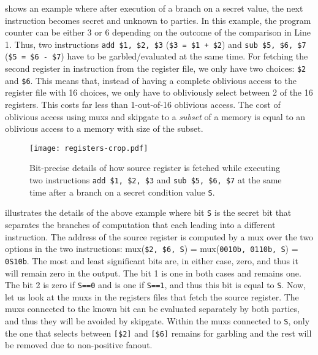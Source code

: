  shows an example where after execution of a branch on a secret value, the next instruction becomes secret and unknown to parties.
In this example, the program counter can be either 3 or 6 depending on the outcome of the comparison in Line 1.
Thus, two instructions \texttt{add \$1, \$2, \$3} (\texttt{\$3 = \$1 + \$2}) and \texttt{sub \$5, \$6, \$7} (\texttt{\$5 = \$6 - \$7}) have to be garbled/evaluated at the same time.
For fetching the second register in instruction from the register file, we only have two choices: \texttt{\$2} and \texttt{\$6}.
This means that, instead of having a complete oblivious access to the register file with 16 choices, we only have to obliviously select between 2 of the 16 registers.
This costs far less than 1-out-of-16 oblivious access.
The cost of oblivious access using \acrshort{mux}s and \gls{skipgate} to a {\it subset} of a memory is equal to an oblivious access to a memory with size of the subset.

\begin{figure}
\centering
\texttt{[image: registers-crop.pdf]}
\caption{Bit-precise details of how source register is fetched while executing two instructions \texttt{add \$1, \$2, \$3} and \texttt{sub \$5, \$6, \$7} at the same time after a branch on a secret condition value \texttt{S}.}
\label{fig:registers}
\end{figure}

 illustrates the details of the above example where bit \texttt{S} is the secret bit that separates the branches of computation that each leading into a different instruction.
The address of the source register is computed by a \acrshort{mux} over the two options in the two instructions: \acrshort{mux}(\texttt{\$2, \$6, S}) = \acrshort{mux}(\texttt{0010b, 0110b, S}) = \texttt{0S10b}.
The most and least significant bits are, in either case, zero, and thus it will remain zero in the output.
The bit 1 is one in both cases and remains one.
The bit 2 is zero if \texttt{S==0} and is one if \texttt{S==1}, and thus this bit is equal to \texttt{S}.
Now, let us look at the \acrshort{mux}s in the registers files that fetch the source register.
The \acrshort{mux}s connected to the known bit can be evaluated separately by both parties, and thus they will be avoided by \gls{skipgate}.
Within the \acrshort{mux}s connected to \texttt{S}, only the one that selects between \texttt{[\$2]} and \texttt{[\$6]} remains for garbling and the rest will be removed due to non-positive fanout.


